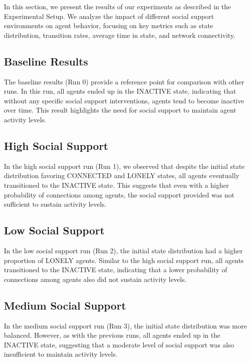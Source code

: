 \documentclass{article} %
\begin{document}
In this section, we present the results of our experiments as described in the Experimental Setup. We analyze the impact of different social support environments on agent behavior, focusing on key metrics such as state distribution, transition rates, average time in state, and network connectivity.

\subsection{Baseline Results}
\label{sec:baseline_results}
The baseline results (Run 0) provide a reference point for comparison with other runs. In this run, all agents ended up in the INACTIVE state, indicating that without any specific social support interventions, agents tend to become inactive over time. This result highlights the need for social support to maintain agent activity levels.

\subsection{High Social Support}
\label{sec:high_support}
In the high social support run (Run 1), we observed that despite the initial state distribution favoring CONNECTED and LONELY states, all agents eventually transitioned to the INACTIVE state. This suggests that even with a higher probability of connections among agents, the social support provided was not sufficient to sustain activity levels.

\subsection{Low Social Support}
\label{sec:low_support}
In the low social support run (Run 2), the initial state distribution had a higher proportion of LONELY agents. Similar to the high social support run, all agents transitioned to the INACTIVE state, indicating that a lower probability of connections among agents also did not sustain activity levels.

\subsection{Medium Social Support}
\label{sec:medium_support}
In the medium social support run (Run 3), the initial state distribution was more balanced. However, as with the previous runs, all agents ended up in the INACTIVE state, suggesting that a moderate level of social support was also insufficient to maintain activity levels.
\end{document}
